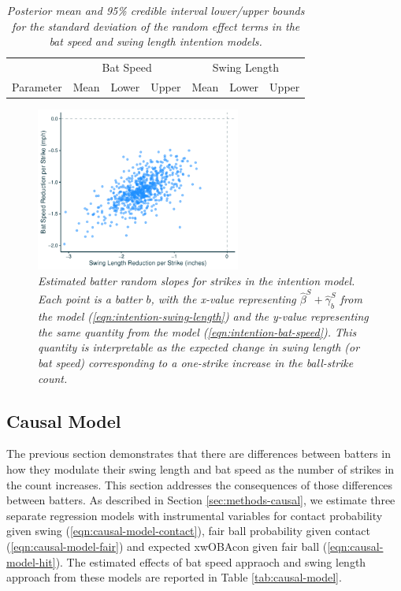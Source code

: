 \documentclass{article}
\begin{document}
      \begin{table}
        \centering
        \begin{tabular}{l|rrr|rrr|}
                  & \multicolumn{3}{c|}{Bat Speed}          & \multicolumn{3}{c|}{Swing Length}  \\
        Parameter & Mean  & Lower  & Upper & Mean  & Lower  & Upper \\
          \hline
          
        \end{tabular}
        \caption{\it Posterior mean and 95\% credible interval lower/upper bounds for the standard deviation of the random effect terms in the bat speed and swing length intention models.}
        \label{tab:intention-variances}
      \end{table}

      \begin{figure}
        \centering
        \includegraphics[width = 0.6\textwidth]{../../figures/approach.pdf}
        \caption{\it Estimated batter random slopes for strikes in the intention model. Each point is a batter $b$, with the x-value representing $\hat\beta^S + \hat\gamma^S_b$ from the model (\ref{eqn:intention-swing-length}) and the y-value representing the same quantity from the model (\ref{eqn:intention-bat-speed}). This quantity is interpretable as the expected change in swing length (or bat speed) corresponding to a one-strike increase in the ball-strike count.}
        \label{fig:approach}
      \end{figure}

    \subsection{Causal Model}
    \label{sec:results-causal}

      The previous section demonstrates that there are differences between batters in how they modulate their swing length and bat speed as the number of strikes in the count increases. This section addresses the consequences of those differences between batters. As described in Section \ref{sec:methods-causal}, we estimate three separate regression models with instrumental variables for contact probability given swing (\ref{eqn:causal-model-contact}), fair ball probability given contact (\ref{eqn:causal-model-fair}) and expected xwOBAcon given fair ball (\ref{eqn:causal-model-hit}). The estimated effects of bat speed appraoch and swing length approach from these models are reported in Table \ref{tab:causal-model}.
\end{document}
